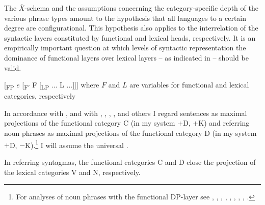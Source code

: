 \documentclass[output=paper,colorlinks,citecolor=brown]{langscibook}
\begin{document}
The $\overline{X}$-schema  and the assumptions concerning the category-specific depth of the various phrase types amount to the hypothesis that all languages to a certain degree are configurational. This hypothesis also applies to the interrelation of the syntactic layers constituted by functional and lexical heads, respectively. It is an empirically important question at which levels of syntactic representation the dominance of functional layers over lexical layers -- as indicated in  -- should be valid.

\ea \label{ex:zi91:9} {[\textsubscript{FP} $e$ [\textsubscript{F$'$} F [\textsubscript{LP} ... L ...]]] \newline where $F$ and $L$ are variables for functional and lexical categories, respectively}
\z

\noindent In accordance with \citet{Chomsky86Barriers}, and with \citet{Fukui86A-theory}, \citet{Abney86Functional-elements, Abney87The-English}, \citet{Haider87Deutsche-Syntax, Haider88Die-Struktur}, \citet{Felix88Structure-functional}, and others I regard sentences as maximal projections of the functional category C (in my system $+$D, $+$K) and referring noun phrases as maximal projections of the functional category D (in my system $+$D, $-$K).\footnote{For analyses of noun phrases with the functional DP-layer see \citet{Szabolosi81The-possessive-Hungarian, Szabolosi83Possessor-ran-away, Szabolosi87Functional-categories}, \citet{Hellan86The-headedness}, \citet{Delsing88The-Scandinavian, Delsing90A-DP-analysis}, \citet{Olsen88Agreement-und-Flexion, Olsen89AGReement-in, Olsen89Das-Possessivum, Olsen88Die-deutsch-Nominalphrase}, \citet{Lobel89Q-as-functional, Lobel88D-und-Q, Lobel90Functional-categories, Lobel90On-the-parametrization}, \citet{Bhatt89Parallels-in, Bhatt90Die-syntaktische, Bhatt90Kasuszuweisung-in}, \citet{Huste89Zur-Syntax, Huste89Zur-Topologie}, \citet{Bischof91Sachverhaltsbezeichnungen-des}, \citet{Freytag90Die-syntaktische, Freytag91Sachverhaltsbezeichnungen-des}.} I will assume the universal .

\ea \label{ex:zi91:10} In referring syntagmas, the functional categories C and D close the projection of the lexical categories V and N, respectively.
\z
\end{document}

